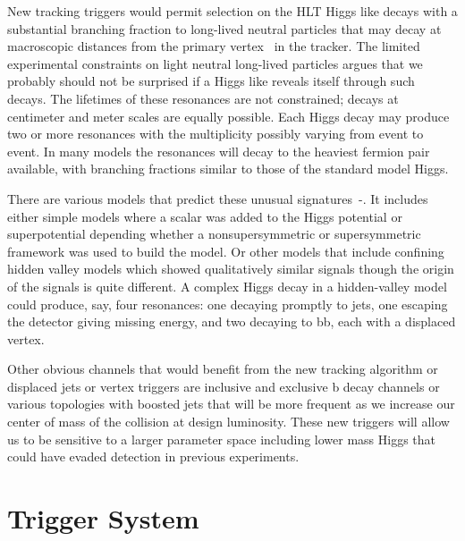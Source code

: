 \documentclass{JINST}
\begin{document}
New tracking triggers would permit selection on the HLT Higgs like decays with a substantial branching fraction to long-lived neutral particles that may decay 
at macroscopic distances from the primary vertex~\cite{bib:hiddenvalley} in the tracker. The limited experimental constraints on light neutral long-lived particles
argues that we probably should not be surprised if a Higgs like reveals itself  through such decays. The lifetimes of these resonances 
are not constrained; decays at centimeter and meter scales are equally possible. Each Higgs decay may produce two or more resonances 
with the multiplicity possibly varying from event to event. In many models the resonances will decay to the heaviest fermion 
pair available, with branching fractions similar to those of the standard model Higgs.  

There are various models that predict these unusual signatures~\cite{bib:hiddenvalley}-\cite{bib:HSV}. 
It includes either simple models where a scalar was added to the Higgs potential or superpotential depending whether a nonsupersymmetric
or supersymmetric framework was used to build the model. 
Or other models that include confining hidden valley models which showed qualitatively similar signals  though the origin of the signals is 
quite different.  A complex Higgs decay in a hidden-valley model could produce, say, four resonances: one decaying promptly to jets,
 one escaping the detector giving missing energy, and two decaying to bb, each with a displaced vertex.  

Other obvious channels that would benefit from the new tracking algorithm or displaced jets or vertex triggers are inclusive
and exclusive b decay channels or various topologies with boosted jets that will be more frequent as we increase our center of
mass of the collision at design luminosity. These new triggers will allow us to be sensitive to a larger  parameter space 
including lower mass Higgs that could have evaded detection  in previous experiments.

\section{Trigger System}
%
\end{document}
